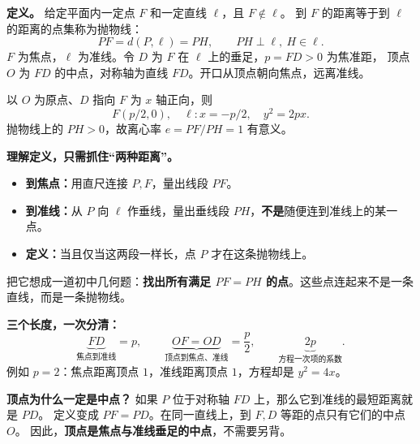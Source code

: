 \begin{statementbox}
\textbf{定义。} 给定平面内一定点 $F$ 和一定直线 $\ell$，且 $F\notin\ell$。
到 $F$ 的距离等于到 $\ell$ 的距离的点集称为抛物线：
\[
\boxed{PF=d(P,\ell)=PH},\qquad PH\perp\ell,\ H\in\ell.
\]
$F$ 为焦点，$\ell$ 为准线。令 $D$ 为 $F$ 在 $\ell$ 上的垂足，$p=FD>0$ 为焦准距，
顶点 $O$ 为 $FD$ 的中点，对称轴为直线 $FD$。开口从顶点朝向焦点，远离准线。

以 $O$ 为原点、$D$ 指向 $F$ 为 $x$ 轴正向，则
\[
F(p/2,0),\quad \ell:x=-p/2,\quad \boxed{y^2=2px}.
\]
抛物线上的 $PH>0$，故离心率 $e=PF/PH=1$ 有意义。
\end{statementbox}

\clearpage
\begin{statementbox}
\textbf{理解定义，只需抓住“两种距离”。}
\begin{itemize}[leftmargin=*]
\item \textbf{到焦点：}用直尺连接 $P,F$，量出线段 $PF$。
\item \textbf{到准线：}从 $P$ 向 $\ell$ 作垂线，量出垂线段 $PH$，\textbf{不是}随便连到准线上的某一点。
\item \textbf{定义：}当且仅当这两段一样长，点 $P$ 才在这条抛物线上。
\end{itemize}
把它想成一道初中几何题：\textbf{找出所有满足 $PF=PH$ 的点}。这些点连起来不是一条直线，而是一条抛物线。

\medskip
\textbf{三个长度，一次分清：}
\[
\underbrace{FD}_{\text{焦点到准线}}=p,\qquad
\underbrace{OF=OD}_{\text{顶点到焦点、准线}}=\frac p2,\qquad
\underbrace{2p}_{\text{方程一次项的系数}}.
\]
例如 $p=2$：焦点距离顶点 $1$，准线距离顶点 $1$，方程却是 $y^2=4x$。

\textbf{顶点为什么一定是中点？}
如果 $P$ 位于对称轴 $FD$ 上，那么它到准线的最短距离就是 $PD$。
定义变成 $PF=PD$。在同一直线上，到 $F,D$ 等距的点只有它们的中点 $O$。
因此，\textbf{顶点是焦点与准线垂足的中点}，不需要另背。
\end{statementbox}
